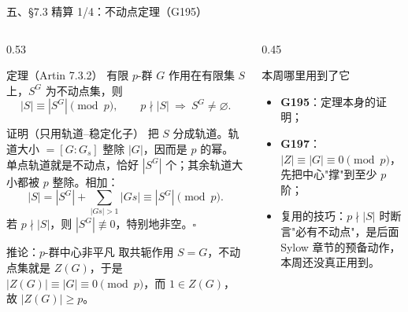 \documentclass[aspectratio=169,10pt,fontset=none]{ctexbeamer}
\newcommand{\ex}[1]{\textcolor{accent}{\footnotesize\bfseries #1}}
\begin{document}
\begin{frame}[t]{五、\S7.3 精算 1/4：不动点定理（G195）}
  \begin{columns}[T,onlytextwidth]
    \begin{column}{0.53\textwidth}
      \begin{block}{定理（Artin 7.3.2）}
        \small
        有限 $p$-群 $G$ 作用在有限集 $S$ 上，$S^G$ 为不动点集，则
        \[ |S|\equiv|S^G|\pmod p,\qquad p\nmid|S|\ \Rightarrow\ S^G\ne\varnothing. \]
      \end{block}
      \begin{block}{\footnotesize 证明（只用轨道--稳定化子）}
        \scriptsize
        把 $S$ 分成轨道。轨道大小 $=[G:G_s]$ 整除 $|G|$，因而是 $p$ 的幂。
        单点轨道就是不动点，恰好 $|S^G|$ 个；其余轨道大小都被 $p$ 整除。相加：
        \[ |S|=|S^G|+\sum_{|Gs|>1}|Gs|\equiv|S^G|\pmod p. \]
        若 $p\nmid|S|$，则 $|S^G|\not\equiv0$，特别地非空。$\square$
      \end{block}
      \begin{alertblock}{\footnotesize 推论：$p$-群中心非平凡}
        \scriptsize
        取共轭作用 $S=G$，不动点集就是 $Z(G)$，于是 $|Z(G)|\equiv|G|\equiv0\pmod p$，而 $1\in Z(G)$，故 $|Z(G)|\ge p$。
      \end{alertblock}
    \end{column}
    \begin{column}{0.45\textwidth}
      \centering

      \vspace{0.4em}
      \raggedright
      \begin{block}{\footnotesize 本周哪里用到了它}
        \scriptsize
        \begin{itemize}\setlength{\itemsep}{1pt}
          \item \ex{G195}：定理本身的证明；
          \item \ex{G197}：$|Z|\equiv|G|\equiv0\pmod p$，先把中心"撑"到至少 $p$ 阶；
          \item 复用的技巧：$p\nmid|S|$ 时断言"必有不动点"，是后面 Sylow 章节的预备动作，本周还没真正用到。
        \end{itemize}
      \end{block}
    \end{column}
  \end{columns}
\end{frame}
\end{document}

